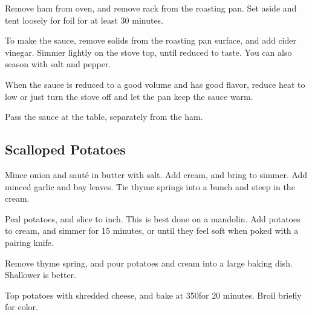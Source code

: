 \begin{recipe}
Remove ham from oven, and remove rack from the roasting pan. Set aside and tent loosely for foil for at least 30 minutes.

To make the sauce, remove solids from the roasting pan surface, and add cider vinegar. Simmer lightly on the stove top, until reduced to taste. You can also season with salt and pepper.

When the sauce is reduced to a good volume and has good flavor, reduce heat to low or just turn the stove off and let the pan keep the sauce warm.

Pass the sauce at the table, separately from the ham.

\columnbreak
\subsection{Scalloped Potatoes}



Mince onion and sauté in butter with salt. Add cream, and bring to simmer. Add minced garlic and bay leaves. Tie thyme springs into a bunch and steep in the cream.


Peal potatoes, and slice to  inch. This is best done on a mandolin. Add potatoes to cream, and simmer for 15 minutes, or until they feel soft when poked with a pairing knife.

Remove thyme spring, and pour potatoes and cream into a large baking dish. Shallower is better.


Top potatoes with shredded cheese, and bake at 350\degree for 20 minutes. Broil briefly for color.

\end{recipe}
